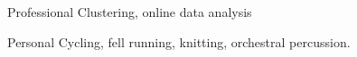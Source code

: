 
\begin{cvskills}
  \cvskill
    {Professional} %
    {Clustering, online data analysis} %

  \cvskill
    {Personal} %
    {Cycling, fell running, knitting, orchestral percussion.} %
\end{cvskills}